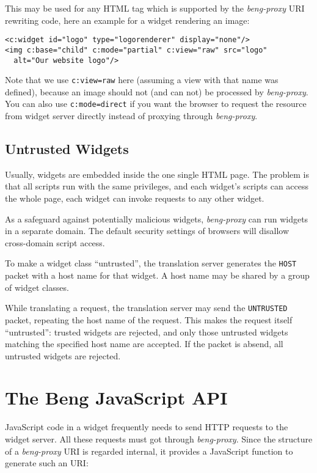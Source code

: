 \documentclass[a4paper,12pt]{article}
\begin{document}
This may be used for any HTML tag which is supported by the
\emph{beng-proxy} URI rewriting code, here an example for a widget
rendering an image:

\begin{verbatim}
<c:widget id="logo" type="logorenderer" display="none"/>
<img c:base="child" c:mode="partial" c:view="raw" src="logo"
  alt="Our website logo"/>
\end{verbatim}

Note that we use \texttt{c:view=raw} here (assuming a view with that
name was defined), because an image should
not (and can not) be processed by \emph{beng-proxy}.  You can also use
\texttt{c:mode=direct} if you want the browser to request the resource
from widget server directly instead of proxying through
\emph{beng-proxy}.

\subsection{Untrusted Widgets}

Usually, widgets are embedded inside the one single HTML page.  The
problem is that all scripts run with the same privileges, and each
widget's scripts can access the whole page, each widget can invoke
requests to any other widget.

As a safeguard against potentially malicious widgets,
\emph{beng-proxy} can run widgets in a separate domain.  The default
security settings of browsers will disallow cross-domain script
access.

To make a widget class ``untrusted'', the translation server generates
the \texttt{HOST} packet with a host name for that widget.  A host
name may be shared by a group of widget classes.

While translating a request, the translation server may send the
\verb|UNTRUSTED| packet, repeating the host name of the request.
This makes the request itself ``untrusted'': trusted widgets are
rejected, and only those untrusted widgets matching the specified host
name are accepted.  If the packet is absend, all untrusted widgets are
rejected.


\section{The Beng JavaScript API}

JavaScript code in a widget frequently needs to send HTTP requests to
the widget server.  All these requests must got through
\emph{beng-proxy}.  Since the structure of a \emph{beng-proxy} URI is
regarded internal, it provides a JavaScript function to generate such
an URI:
\end{document}
